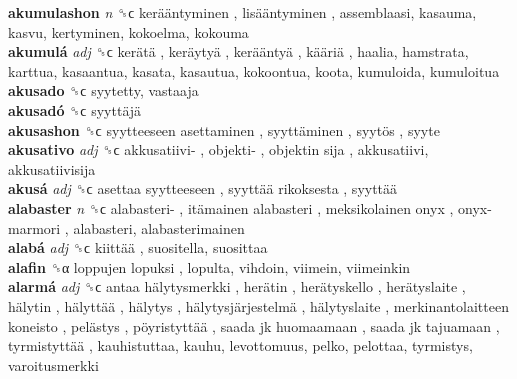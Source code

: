 \textbf{akumulashon} \emph{n}  ␝ϲ   kerääntyminen ,  lisääntyminen , assemblaasi, kasauma, kasvu, kertyminen, kokoelma, kokouma  \\
\textbf{akumulá} \emph{adj}  ␝ϲ   kerätä ,  keräytyä ,  kerääntyä ,  kääriä , haalia, hamstrata, karttua, kasaantua, kasata, kasautua, kokoontua, koota, kumuloida, kumuloitua  \\
\textbf{akusado} ␝ϲ  syytetty, vastaaja  \\
\textbf{akusadó} ␝ϲ   syyttäjä   \\
\textbf{akusashon} ␝ϲ   syytteeseen asettaminen ,  syyttäminen ,  syytös , syyte  \\
\textbf{akusativo} \emph{adj}  ␝ϲ   akkusatiivi- ,  objekti- ,  objektin sija , akkusatiivi, akkusatiivisija  \\
\textbf{akusá} \emph{adj}  ␝ϲ   asettaa syytteeseen ,  syyttää rikoksesta ,  syyttää   \\
\textbf{alabaster} \emph{n}  ␝ϲ   alabasteri- ,  itämainen alabasteri ,  meksikolainen onyx ,  onyx-marmori , alabasteri, alabasterimainen  \\
\textbf{alabá} \emph{adj}  ␝ϲ   kiittää , suositella, suosittaa  \\
\textbf{alafin} ␝α   loppujen lopuksi , lopulta, vihdoin, viimein, viimeinkin  \\
\textbf{alarmá} \emph{adj}  ␝ϲ   antaa hälytysmerkki ,  herätin ,  herätyskello ,  herätyslaite ,  hälytin ,  hälyttää ,  hälytys ,  hälytysjärjestelmä ,  hälytyslaite ,  merkinantolaitteen koneisto ,  pelästys ,  pöyristyttää ,  saada jk huomaamaan ,  saada jk tajuamaan ,  tyrmistyttää , kauhistuttaa, kauhu, levottomuus, pelko, pelottaa, tyrmistys, varoitusmerkki  \\
